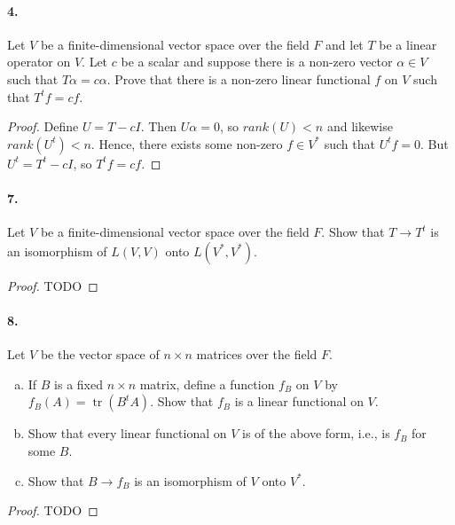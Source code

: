 \documentclass{article}
\DeclareMathOperator{\tr}{tr}
\begin{document}
\paragraph{4.} Let $V$ be a finite-dimensional vector space over the field $F$
and let $T$ be a linear operator on $V$. Let $c$ be a scalar and suppose there
is a non-zero vector $\alpha \in V$ such that $T\alpha = c\alpha$. Prove that
there is a non-zero linear functional $f$ on $V$ such that $T^tf = cf$.

\begin{proof}
  Define $U = T - cI$. Then $U\alpha = 0$, so $rank(U) < n$ and likewise
  $rank(U^t) < n$. Hence, there exists some non-zero $f \in V^*$ such that
  $U^tf = 0$. But $U^t = T^t - cI$, so $T^tf = cf$.
\end{proof}

\paragraph{7.} Let $V$ be a finite-dimensional vector space over the field $F$.
Show that $T \to T^t$ is an isomorphism of $L(V, V)$ onto $L(V^*, V^*)$.

\begin{proof}
  TODO
\end{proof}

\paragraph{8.} Let $V$ be the vector space of $n \times n$ matrices over the
field $F$.
\begin{enumerate}[(a)]
  \item If $B$ is a fixed $n \times n$ matrix, define a function $f_B$ on $V$ by
    $f_B(A) = \tr(B^tA)$. Show that $f_B$ is a linear functional on $V$.
  \item Show that every linear functional on $V$ is of the above form, i.e., is
    $f_B$ for some $B$.
  \item Show that $B \to f_B$ is an isomorphism of $V$ onto $V^*$.
\end{enumerate}

\begin{proof}
  TODO
\end{proof}
\end{document}
